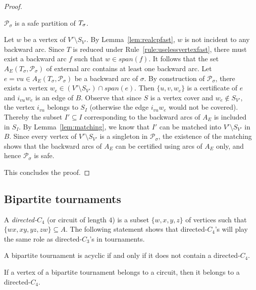\begin{proof}
\begin{claim} \label{claim:pissafe}
$\mathcal{P}_\sigma$ is a safe partition of $T_{\sigma}$.
\end{claim}
\begin{proofclaim}
Let $w$ be a vertex of $V'\setminus S_{V'}$. By Lemma~\ref{lem:realcpfast}, $w$ is not incident to any backward arc.
Since $T$ is reduced under Rule~\ref{rule:uselessvertexfast}, there must exist a backward arc $f$ such that $w\in span(f)$. It follows that the set $A_E(T_{\sigma},\mathcal{P}_\sigma)$ of external arc contains at least one backward arc. 
Let $e=vu\in A_E(T_{\sigma},\mathcal{P}_\sigma)$ be a backward arc of $\sigma$. By construction of $\mathcal{P}_\sigma$, there exists a vertex $w_e \in (V' \setminus S_{V'})\cap span(e)$. Then $\{u,v,w_e\}$ is a certificate of $e$ and $i_{vu}w_e$ is an edge of $B$. Observe that since $S$ is a vertex cover and $w_e \notin S_{V'}$, the vertex $i_{vu}$ belongs to $S_I$ (otherwise the edge $i_{vu}w_e$ would not be covered). Thereby the subset $I'\subseteq I$ corresponding to the backward arcs of $A_E$ is included in $S_I$. 
By Lemma~\ref{lem:matching}, we know that $I'$ can be matched into $V' \setminus S_{V'}$ in $B$. 
Since every vertex of $V' \setminus S_{V'}$ is a singleton in $\mathcal{P}_\sigma$, the existence of the matching shows that the backward arcs of $A_E$ can be certified using arcs of $A_E$ only, and hence $\mathcal{P}_\sigma$ is safe. 
\end{proofclaim}

This concludes the proof. 
\end{proof}
 
\subsection{Bipartite tournaments}

A  \emph{directed-$C_4$} (or circuit of length $4$) is a subset $\{w,x,y,z\}$ of vertices such that $\{wx, xy, yz, zw\}\subseteq A$. The following statement shows that directed-$C_4$'s will play the same role as directed-$C_3$'s in tournaments. 

\begin{lemma}\cite{DGHNT10}
A bipartite tournament is acyclic if and only if it does not contain a directed-$C_4$.
\end{lemma}

\begin{lemma} \cite{MRRS13}
If a vertex of a bipartite tournament belongs to a circuit, then it belongs to a directed-$C_4$.
\end{lemma}

